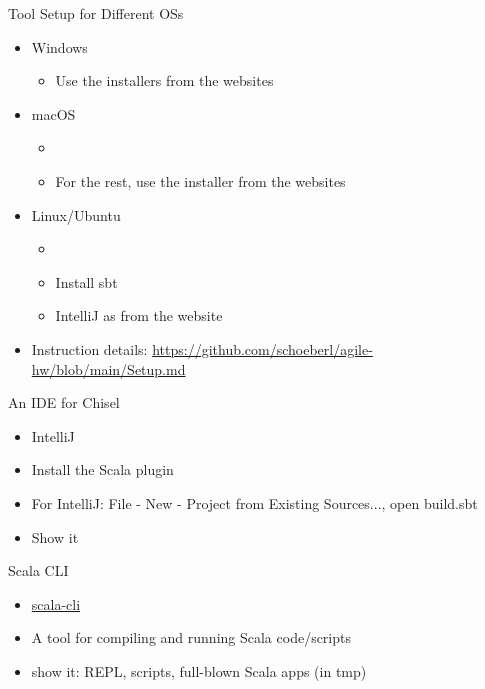 \begin{frame}[fragile]{Tool Setup for Different OSs}
\begin{itemize}
\item Windows
\begin{itemize}
\item Use the installers from the websites
\end{itemize}
\item macOS
\begin{itemize}
\item {}
\item For the rest, use the installer from the websites
\end{itemize}
\item Linux/Ubuntu
\begin{itemize}
\item {}
\item Install sbt
\item IntelliJ as from the website
\end{itemize}
\item Instruction details: \url{https://github.com/schoeberl/agile-hw/blob/main/Setup.md}
\end{itemize}
\end{frame}


\begin{frame}[fragile]{An IDE for Chisel}
\begin{itemize}
\item IntelliJ
\item Install the Scala plugin
\item For IntelliJ: File - New - Project from Existing Sources..., open build.sbt
\item Show it %
\end{itemize}
\end{frame}


\begin{frame}[fragile]{Scala CLI}
\begin{itemize}
\item \href{https://scala-cli.virtuslab.org/}{scala-cli}
\item A tool for compiling and running Scala code/scripts
\item show it: REPL, scripts, full-blown Scala apps (in tmp)
\end{itemize}
\end{frame}

